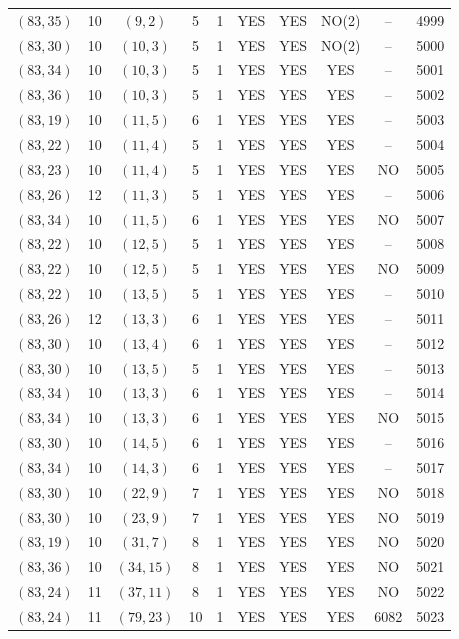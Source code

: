 \begin{longtable}{|c|c|c|c|c|c|c|c|c|c|}
$(83, 35)$ & 10 & $(9, 2)$ & 5 & 1 & YES & YES & NO(2) & -- & 4999\\
$(83, 30)$ & 10 & $(10, 3)$ & 5 & 1 & YES & YES & NO(2) & -- & 5000\\
$(83, 34)$ & 10 & $(10, 3)$ & 5 & 1 & YES & YES & YES & -- & 5001\\
$(83, 36)$ & 10 & $(10, 3)$ & 5 & 1 & YES & YES & YES & -- & 5002\\
$(83, 19)$ & 10 & $(11, 5)$ & 6 & 1 & YES & YES & YES & -- & 5003\\
$(83, 22)$ & 10 & $(11, 4)$ & 5 & 1 & YES & YES & YES & -- & 5004\\
$(83, 23)$ & 10 & $(11, 4)$ & 5 & 1 & YES & YES & YES & NO & 5005\\
$(83, 26)$ & 12 & $(11, 3)$ & 5 & 1 & YES & YES & YES & -- & 5006\\
$(83, 34)$ & 10 & $(11, 5)$ & 6 & 1 & YES & YES & YES & NO & 5007\\
$(83, 22)$ & 10 & $(12, 5)$ & 5 & 1 & YES & YES & YES & -- & 5008\\
$(83, 22)$ & 10 & $(12, 5)$ & 5 & 1 & YES & YES & YES & NO & 5009\\
$(83, 22)$ & 10 & $(13, 5)$ & 5 & 1 & YES & YES & YES & -- & 5010\\
$(83, 26)$ & 12 & $(13, 3)$ & 6 & 1 & YES & YES & YES & -- & 5011\\
$(83, 30)$ & 10 & $(13, 4)$ & 6 & 1 & YES & YES & YES & -- & 5012\\
$(83, 30)$ & 10 & $(13, 5)$ & 5 & 1 & YES & YES & YES & -- & 5013\\
$(83, 34)$ & 10 & $(13, 3)$ & 6 & 1 & YES & YES & YES & -- & 5014\\
$(83, 34)$ & 10 & $(13, 3)$ & 6 & 1 & YES & YES & YES & NO & 5015\\
$(83, 30)$ & 10 & $(14, 5)$ & 6 & 1 & YES & YES & YES & -- & 5016\\
$(83, 34)$ & 10 & $(14, 3)$ & 6 & 1 & YES & YES & YES & -- & 5017\\
$(83, 30)$ & 10 & $(22, 9)$ & 7 & 1 & YES & YES & YES & NO & 5018\\
$(83, 30)$ & 10 & $(23, 9)$ & 7 & 1 & YES & YES & YES & NO & 5019\\
$(83, 19)$ & 10 & $(31, 7)$ & 8 & 1 & YES & YES & YES & NO & 5020\\
$(83, 36)$ & 10 & $(34, 15)$ & 8 & 1 & YES & YES & YES & NO & 5021\\
$(83, 24)$ & 11 & $(37, 11)$ & 8 & 1 & YES & YES & YES & NO & 5022\\
$(83, 24)$ & 11 & $(79, 23)$ & 10 & 1 & YES & YES & YES & 6082 & 5023\\

\end{longtable}
